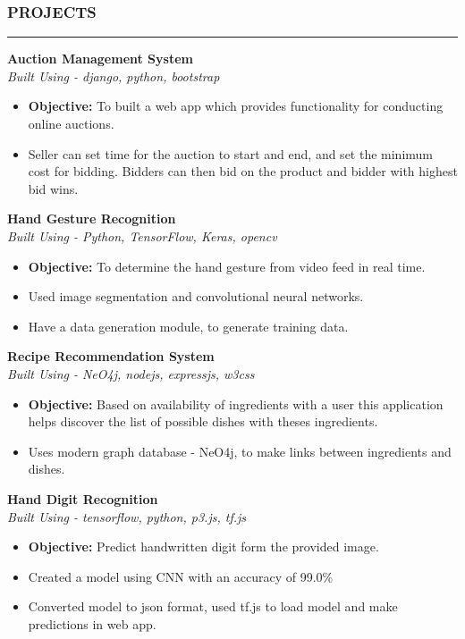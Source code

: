 \documentclass[a4paper]{article}
\begin{document}
\subsubsection*{PROJECTS}
\hrule

\vspace{10pt}
\noindent
\textbf{Auction Management System} \\
\textit{Built Using - django, python, bootstrap}
\begin{itemize}[leftmargin=*, nosep]
    \item \textbf{Objective:} To built a web app which provides functionality for conducting online auctions.
    \item Seller can set time for the auction to start and end, and set the minimum cost for bidding.
          Bidders can then bid on the product and bidder with highest bid wins.
\end{itemize}

\vspace{10pt}
\noindent
\textbf{Hand Gesture Recognition} \\
\textit{Built Using - Python, TensorFlow, Keras, opencv}
\begin{itemize} [leftmargin=*, nosep]
    \item \textbf{Objective:} To determine the hand gesture from video feed in real time.
    \item Used image segmentation and convolutional neural networks.
    \item Have a data generation module, to generate training data.
\end{itemize}

\vspace{10pt}
\noindent
\textbf{Recipe Recommendation System} \\
\textit{Built Using - NeO4j, nodejs, expressjs, w3css}
\begin{itemize}[leftmargin=*, nosep]
    \item \textbf{Objective:} Based on availability of ingredients with a user this application
          helps discover the list of possible dishes with theses ingredients.
    \item Uses modern graph database - NeO4j, to make links between ingredients and dishes.
\end{itemize}

\vspace{10pt}
\noindent
\textbf{Hand Digit Recognition} \\
\textit{Built Using - tensorflow, python, p3.js, tf.js}
\begin{itemize}[leftmargin=*, nosep]
    \item \textbf{Objective:} Predict handwritten digit form the provided image.
    \item Created a model using CNN with an accuracy of 99.0\%
    \item Converted model to json format, used tf.js to load model and make predictions in web app.
\end{itemize}
\end{document}
